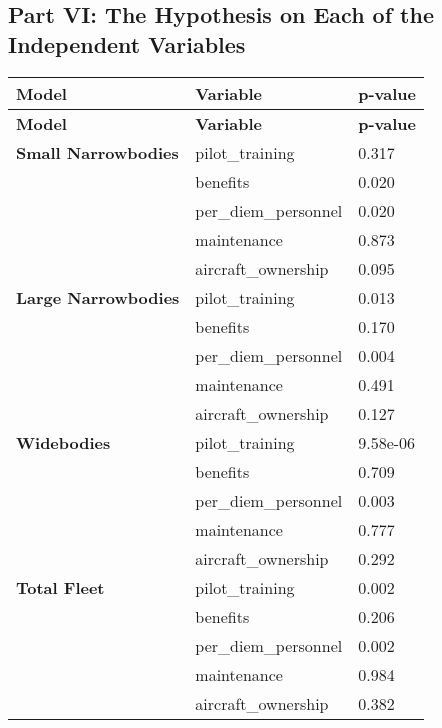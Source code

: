 \subsection{Part VI: The Hypothesis on Each of the Independent Variables}
\begin{longtable}{|l|l|l|}
    \hline
    \textbf{Model} & \textbf{Variable}    & \textbf{p-value} \\ \hline
    \endfirsthead

    \hline
    \textbf{Model} & \textbf{Variable}    & \textbf{p-value} \\ \hline
    \endhead

    \hline
    \endfoot

    \hline
    \endlastfoot

    \textbf{Small Narrowbodies}
                   & pilot\_training      & 0.317            \\
                   & benefits             & 0.020            \\
                   & per\_diem\_personnel & 0.020            \\
                   & maintenance          & 0.873            \\
                   & aircraft\_ownership  & 0.095            \\ \hline

    \textbf{Large Narrowbodies}
                   & pilot\_training      & 0.013            \\
                   & benefits             & 0.170            \\
                   & per\_diem\_personnel & 0.004            \\
                   & maintenance          & 0.491            \\
                   & aircraft\_ownership  & 0.127            \\ \hline

    \textbf{Widebodies}
                   & pilot\_training      & 9.58e-06         \\
                   & benefits             & 0.709            \\
                   & per\_diem\_personnel & 0.003            \\
                   & maintenance          & 0.777            \\
                   & aircraft\_ownership  & 0.292            \\ \hline

    \textbf{Total Fleet}
                   & pilot\_training      & 0.002            \\
                   & benefits             & 0.206            \\
                   & per\_diem\_personnel & 0.002            \\
                   & maintenance          & 0.984            \\
                   & aircraft\_ownership  & 0.382            \\ \hline
\end{longtable}

